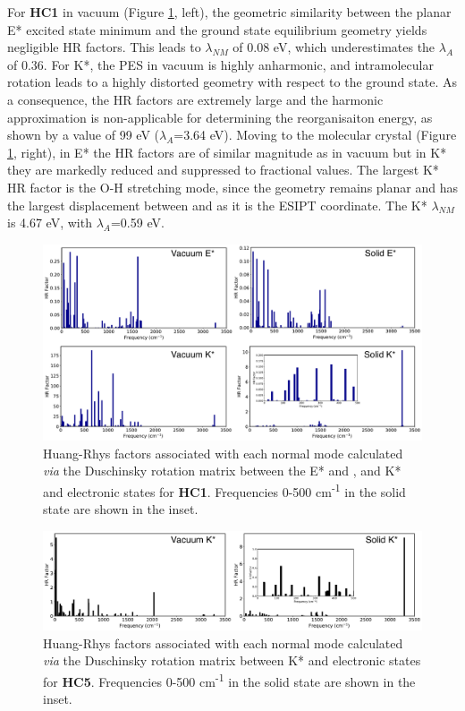 For \textbf{HC1} in vacuum (Figure \ref{figure: HC1_DUSHIN}, left), the geometric similarity between the planar E* excited state minimum and the ground state equilibrium geometry yields negligible HR factors. This leads to $\lambda_{NM}$ of 0.08 eV, which underestimates the $\lambda_{A}$ of 0.36. For K*, the PES in vacuum is highly anharmonic, and intramolecular rotation leads to a highly distorted geometry with respect to the ground state. As a consequence, the HR factors are extremely large and the harmonic approximation is non-applicable for determining the reorganisaiton energy, as shown by a value of 99 eV ($\lambda_{A}$=3.64 eV). Moving to the molecular crystal (Figure \ref{figure: HC1_DUSHIN}, right), in E* the HR factors are of similar magnitude as in vacuum but in K* they are markedly reduced and suppressed to fractional values. The largest K* HR factor is the O-H stretching mode, since the geometry remains planar and has the largest displacement between \szero{} and \sone{} as it is the ESIPT coordinate. The K* $\lambda_{NM}$ is 4.67 eV, with $\lambda_{A}$=0.59 eV. 

\begin{figure}[t]
\centering
  \includegraphics[width=\linewidth]{5ConnectingCrystalStructure/HC1_DUSHIN}
  \caption[HR factors for \textbf{HC1}]{Huang-Rhys factors associated with each normal mode calculated \textit{via} the Duschinsky rotation matrix between the E* and \szero{}, and K* and \szero{} electronic states for \textbf{HC1}. Frequencies 0-500 cm\textsuperscript{-1} in the solid state are shown in the inset.}
  \label{figure: HC1_DUSHIN}
\end{figure}

\begin{figure}[H]
\centering
  \includegraphics[width=\linewidth]{5ConnectingCrystalStructure/HC5_DUSHIN}
  \caption[HR factors for \textbf{HC5}]{Huang-Rhys factors associated with each normal mode calculated \textit{via} the Duschinsky rotation matrix between  K* and \szero{} electronic states for \textbf{HC5}. Frequencies 0-500 cm\textsuperscript{-1} in the solid state are shown in the inset.}
  \label{figure: HC5_DUSHIN}
\end{figure}

